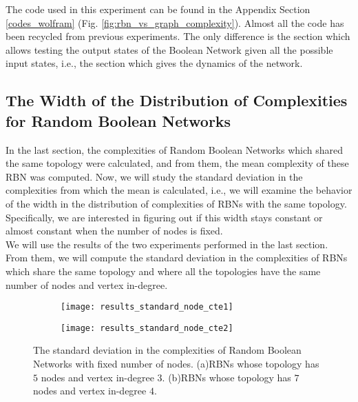 The code used in this experiment can be found in the Appendix Section \ref{codes_wolfram} (Fig. \ref{fig:rbn_vs_graph_complexity}). Almost all the code has been recycled from previous experiments. The only difference is the section which allows testing the output states of the Boolean Network given all the possible input states, i.e., the section which gives the dynamics of the network.

\subsection{The Width of the Distribution of Complexities for Random Boolean Networks}
In the last section, the complexities of Random Boolean Networks which shared the same topology were calculated, and from them, the mean complexity of these RBN was computed. Now, we will study the standard deviation in the complexities from which the mean is calculated, i.e., we will examine the behavior of the width in the distribution of complexities of RBNs with the same topology. Specifically, we are interested in figuring out if this width stays constant or almost constant when the number of nodes is fixed.\\

We will use the results of the two experiments performed in the last section. From them, we will compute the standard deviation in the complexities of RBNs which share the same topology and where all the topologies have the same number of nodes and vertex in-degree.\\

\begin{figure}
	\centering
	\begin{subfigure}[b]{0.7\textwidth}
		\centering
		\texttt{[image: results\_standard\_node\_cte1]}
		\caption{}
		\label{fig:results_standard_node_cte1}
	\end{subfigure}
	\hfill
	\begin{subfigure}[b]{0.7\textwidth}
		\centering
		\texttt{[image: results\_standard\_node\_cte2]}
		\caption{}
		\label{fig:results_standard_node_cte2}
	\end{subfigure}
	\caption[The standard deviation in the complexities of Random Boolean Networks with fixed number of nodes.]{The standard deviation in the complexities of Random Boolean Networks with fixed number of nodes. (a)RBNs whose topology has $5$ nodes and vertex in-degree $3$. (b)RBNs whose topology has $7$ nodes and vertex in-degree $4$.}
	\label{fig:results_standard_node_cte}
\end{figure}


